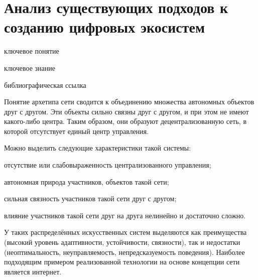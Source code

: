 \section{Анализ существующих подходов к созданию цифровых экосистем}
{\label{sec_ecosystem_automation_principles}} 

\begin{SCn}

\bigskip

\begin{scnrelfromlist}{ключевое понятие}
\end{scnrelfromlist}

\bigskip

\begin{scnrelfromlist}{ключевое знание}
\end{scnrelfromlist}

\bigskip

\begin{scnrelfromlist}{библиографическая ссылка}
\end{scnrelfromlist}

\end{SCn}    

Понятие архетипа сети сводится к объединению множества автономных объектов друг с другом. Эти объекты сильно связны друг с другом, и при этом не имеют какого-либо центра. Таким образом, они образуют децентрализованную сеть, в которой отсутствует единый центр управления.

Можно выделить следующие характеристики такой системы:
\begin{textitemize}
    \item отсутствие или слабовыраженность централизованного управления;
    \item автономная природа участников, объектов такой сети;
    \item сильная связность участников такой сети друг с другом;
    \item влияние участников такой сети друг на друга нелинейно и достаточно сложно.
\end{textitemize}

У таких распределённых искусственных систем выделяются как преимущества (высокий уровень адаптивности, устойчивости, связности), так и недостатки (неоптимальность, неуправляемость, непредсказуемость поведения). Наиболее подходящим примером реализованной технологии на основе концепции сети является интернет.


